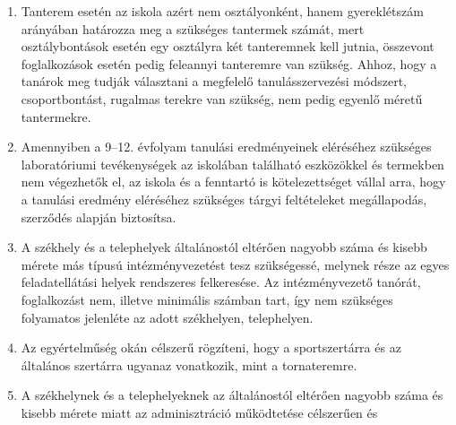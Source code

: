 
\begin{enumerate}
\def\labelenumi{(\arabic{enumi})}
\tightlist
\item
  Tanterem esetén az iskola azért nem osztályonként, hanem gyereklétszám
  arányában határozza meg a szükséges tantermek számát, mert
  osztálybontások esetén egy osztályra két tanteremnek kell jutnia,
  összevont foglalkozások esetén pedig feleannyi tanteremre van
  szükség. Ahhoz, hogy a tanárok meg tudják választani a megfelelő
  tanulásszervezési módszert, csoportbontást, rugalmas terekre van
  szükség, nem pedig egyenlő méretű tantermekre.
\item
  Amennyiben a 9--12. évfolyam tanulási eredményeinek eléréséhez
  szükséges laboratóriumi tevékenységek az iskolában található
  eszközökkel és termekben nem végezhetők el, az iskola és a fenntartó
  is kötelezettséget vállal arra, hogy a tanulási eredmény eléréséhez
  szükséges tárgyi feltételeket megállapodás, szerződés alapján
  biztosítsa.
\item
  A székhely és a telephelyek általánostól eltérően nagyobb száma és
  kisebb mérete más típusú intézményvezetést tesz szükségessé, melynek
  része az egyes feladatellátási helyek rendszeres felkeresése. Az
  intézményvezető tanórát, foglalkozást nem, illetve minimális számban
  tart, így nem szükséges folyamatos jelenléte az adott székhelyen,
  telephelyen.
\item
  Az egyértelműség okán célszerű rögzíteni, hogy a sportszertárra és
  az általános szertárra ugyanaz vonatkozik, mint a tornateremre.
\item
  A székhelynek és a telephelyeknek az általánostól eltérően nagyobb száma és
  kisebb mérete miatt az adminisztráció működtetése célszerűen és

\end{enumerate}
